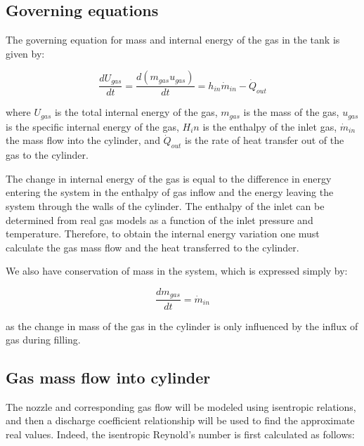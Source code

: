 


\subsection{Governing equations}

The governing equation for mass and internal energy of the gas in the tank is given by:

\begin{equation}
\frac{dU_{gas}}{dt} = \frac{d\left(m_{gas}u_{gas}\right)}{dt} = h_{in}\dot m_{in} - \dot Q_{out}
\end{equation}


\noindent where $U_{gas}$ is the total internal energy of the gas, $m_{gas}$ is the mass of the gas, $u_{gas}$ is the specific internal energy of the gas, $H_in$ is the enthalpy of the inlet gas, $\dot m_{in}$ the mass flow into the cylinder, and $\dot Q_{out}$ is the rate of heat transfer out of the gas to the cylinder.

The change in internal energy of the gas is equal to the difference in energy entering the system in the enthalpy of gas inflow and the energy leaving the system through the walls of the cylinder. The enthalpy of the inlet can be determined from real gas models as a function of the inlet pressure and temperature. Therefore, to obtain the internal energy variation one must calculate the gas mass flow and the heat transferred to the cylinder.

We also have conservation of mass in the system, which is expressed simply by:

\begin{equation}
\frac{dm_{gas}}{dt} = \dot m_{in}
\end{equation}

\noindent as the change in mass of the gas in the cylinder is only influenced by the influx of gas during filling.


\subsection{Gas mass flow into cylinder}

The nozzle and corresponding gas flow will be modeled using isentropic relations, and then a discharge coefficient relationship will be used to find the approximate real values. Indeed, the isentropic Reynold's number is first calculated as follows:

